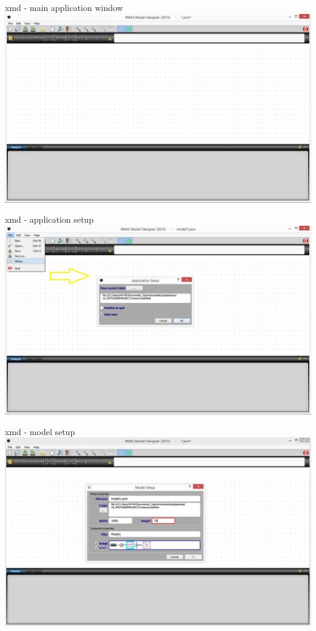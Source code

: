 \documentclass[11pt]{beamer}
\begin{document}
\begin{frame}{xmd - main application window}
	\includegraphics[width=.90\linewidth]{pictures/2b-xmd-empty}
\end{frame}
\begin{frame}{xmd - application setup}
	\includegraphics[width=.90\linewidth]{pictures/2c-xmd-app-setup}
\end{frame}
\begin{frame}{xmd - model setup}
	\includegraphics[width=.90\linewidth]{pictures/2d-xmd-model-setup}
\end{frame}
\end{document}
